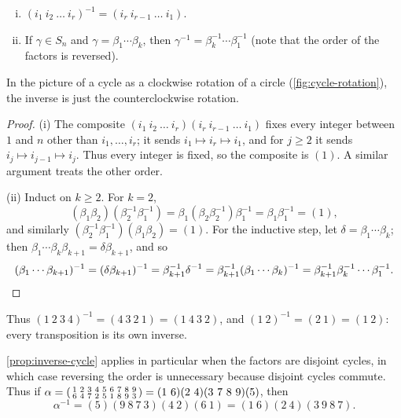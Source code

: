 \begin{proposition}[Inverses]\label{prop:inverse-cycle}
	\begin{enumerate}[(i)]
		\item \((i_1\ i_2\ \dots\ i_r)^{-1} = (i_r\ i_{r-1}\ \dots\ i_1)\).
		\item If \(\gamma \in S_n\) and \(\gamma = \beta_1 \cdots \beta_k\), then
		      \(\gamma^{-1} = \beta_k^{-1} \cdots \beta_1^{-1}\) (note that the order of the
		      factors is reversed).
	\end{enumerate}
\end{proposition}

\begin{intuition}
	In the picture of a cycle as a clockwise rotation of a circle
	(\autoref{fig:cycle-rotation}), the inverse is just the counterclockwise rotation.
\end{intuition}

\begin{proof}
	(i) The composite \((i_1\ i_2\ \dots\ i_r)(i_r\ i_{r-1}\ \dots\ i_1)\) fixes every
	integer between \(1\) and \(n\) other than \(i_1, \dots, i_r\); it sends
	\(i_1 \mapsto i_r \mapsto i_1\), and for \(j \geq 2\) it sends
	\(i_j \mapsto i_{j-1} \mapsto i_j\). Thus every integer is fixed, so the composite is
	\((1)\). A similar argument treats the other order.

	(ii) Induct on \(k \geq 2\). For \(k = 2\),
	\[
		(\beta_1\beta_2)(\beta_2^{-1}\beta_1^{-1})
		= \beta_1(\beta_2\beta_2^{-1})\beta_1^{-1}
		= \beta_1\beta_1^{-1} = (1),
	\]
	and similarly \((\beta_2^{-1}\beta_1^{-1})(\beta_1\beta_2) = (1)\). For the inductive
	step, let \(\delta = \beta_1\cdots\beta_k\); then
	\(\beta_1 \cdots \beta_k\beta_{k+1} = \delta\beta_{k+1}\), and so
	\[
		(\beta_1 \cdots \beta_{k+1})^{-1}
		= (\delta\beta_{k+1})^{-1}
		= \beta_{k+1}^{-1}\delta^{-1}
		= \beta_{k+1}^{-1}(\beta_1\cdots\beta_k)^{-1}
		= \beta_{k+1}^{-1}\beta_k^{-1}\cdots\beta_1^{-1}. \qedhere
	\]
\end{proof}

Thus \((1\ 2\ 3\ 4)^{-1} = (4\ 3\ 2\ 1) = (1\ 4\ 3\ 2)\), and
\((1\ 2)^{-1} = (2\ 1) = (1\ 2)\): every transposition is its own inverse.

\begin{eg}
	\autoref{prop:inverse-cycle} applies in particular when the factors are disjoint
	cycles, in which case reversing the order is unnecessary because disjoint cycles commute.
	Thus if \(\alpha = \begin{psmallmatrix} 1&2&3&4&5&6&7&8&9 \\ 6&4&7&2&5&1&8&9&3
	\end{psmallmatrix} = (1\ 6)(2\ 4)(3\ 7\ 8\ 9)(5)\), then
	\[
		\alpha^{-1} = (5)(9\ 8\ 7\ 3)(4\ 2)(6\ 1) = (1\ 6)(2\ 4)(3\ 9\ 8\ 7).
	\]
\end{eg}

